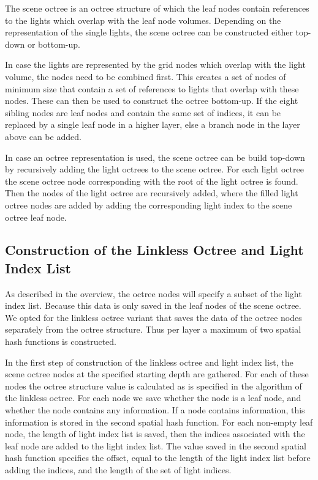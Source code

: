 The scene octree is an octree structure of which the leaf nodes contain references
to the lights which overlap with the leaf node volumes. Depending on the representation
of the single lights, the scene octree can be constructed either top-down or bottom-up.

In case the lights are represented by the grid nodes which overlap with the light volume,
the nodes need to be combined first. This creates a set of nodes of minimum size that contain a set of
references to lights that overlap with these nodes. These can then be used to construct
the octree bottom-up. If the eight sibling nodes are leaf nodes and contain the same set of indices, it can
be replaced by a single leaf node in a higher layer, else a branch node in the layer above can be
added.

In case an octree representation is used, the scene octree can be build top-down by
recursively adding the light octrees to the scene octree. For each light octree the
scene octree node corresponding with the root of the light octree is found. Then the nodes
of the light octree are recursively added, where the filled light octree nodes are added
by adding the corresponding light index to the scene octree leaf node.

\subsection{Construction of the Linkless Octree and Light Index List}

As described in the overview, the octree nodes will specify a subset of the light index list.
Because this data is only saved in the leaf nodes of the scene octree. We opted for the
linkless octree variant that saves the data of the octree nodes separately from the octree
structure. Thus per layer a maximum of two spatial hash functions is constructed.

In the first step of construction of the linkless octree and light index list, the scene
octree nodes at the specified starting depth are gathered. For each of these nodes the
octree structure value is calculated as is specified in the algorithm of the linkless octree.
For each node we save whether the node is a leaf node, and whether the node contains any
information. If a node contains information, this information is stored in the second
spatial hash function. For each non-empty leaf node, the length of light index list
is saved, then the indices associated with the leaf node are added to the light index list.
The value saved in the second spatial hash function specifies the offset, equal to the length
of the light index list before adding the indices, and the length of the set of light indices.

